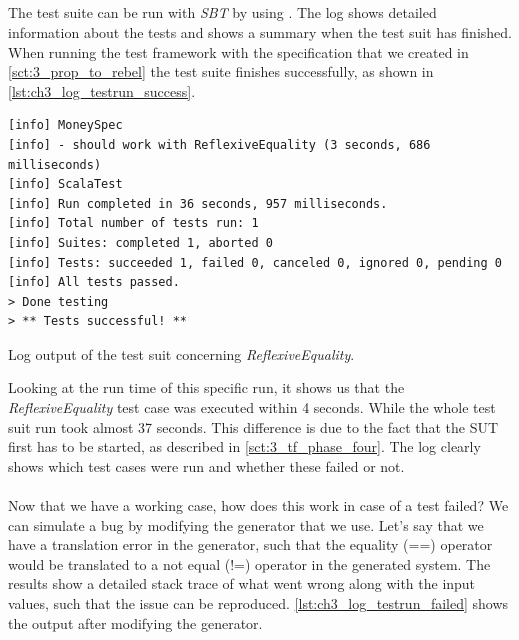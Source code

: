 \subsection{\tfPhaseFive{}}
The test suite can be run with \textit{SBT} by using . The log shows detailed information about the tests and shows a summary when the test suit has finished. When running the test framework with the specification that we created in \autoref{sct:3_prop_to_rebel} the test suite finishes successfully, as shown in \autoref{lst:ch3_log_testrun_success}.
\FloatBarrier
\begin{sourcecode}[h!]
\begin{lstlisting}[language=Log]
[info] MoneySpec
[info] - should work with ReflexiveEquality (3 seconds, 686 milliseconds)
[info] ScalaTest
[info] Run completed in 36 seconds, 957 milliseconds.
[info] Total number of tests run: 1
[info] Suites: completed 1, aborted 0
[info] Tests: succeeded 1, failed 0, canceled 0, ignored 0, pending 0
[info] All tests passed.
> Done testing
> ** Tests successful! **
\end{lstlisting}
\caption{Log output of the test suit concerning \textit{ReflexiveEquality}.}
\label{lst:ch3_log_testrun_success}
\end{sourcecode}
\FloatBarrier
Looking at the run time of this specific run, it shows us that the \textit{ReflexiveEquality} test case was executed within 4 seconds. While the whole test suit run took almost 37 seconds. This difference is due to the fact that the SUT first has to be started, as described in \autoref{sct:3_tf_phase_four}. The log clearly shows which test cases were run and whether these failed or not.\\
\\
Now that we have a working case, how does this work in case of a test failed? We can simulate a bug by modifying the generator that we use. Let's say that we have a translation error in the generator, such that the equality (==) operator would be translated to a not equal (!=) operator in the generated system. The results show a detailed stack trace of what went wrong along with the input values, such that the issue can be reproduced. \autoref{lst:ch3_log_testrun_failed} shows the output after modifying the generator.
\FloatBarrier
